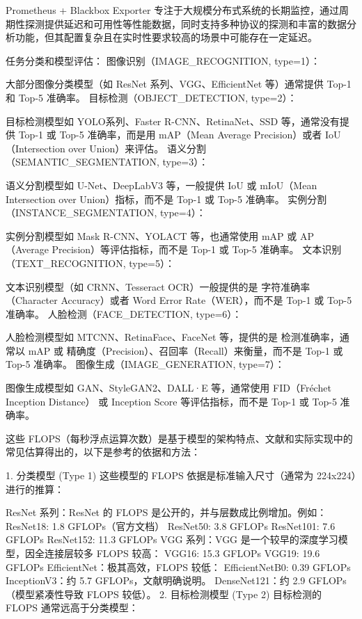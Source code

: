 Prometheus + Blackbox Exporter 专注于大规模分布式系统的长期监控，通过周期性探测提供延迟和可用性等性能数据，同时支持多种协议的探测和丰富的数据分析功能，但其配置复杂且在实时性要求较高的场景中可能存在一定延迟。


任务分类和模型评估：
图像识别（IMAGE_RECOGNITION, type=1）：

大部分图像分类模型（如 ResNet 系列、VGG、EfficientNet 等）通常提供 Top-1 和 Top-5 准确率。
目标检测（OBJECT_DETECTION, type=2）：

目标检测模型如 YOLO系列、Faster R-CNN、RetinaNet、SSD 等，通常没有提供 Top-1 或 Top-5 准确率，而是用 mAP（Mean Average Precision）或者 IoU（Intersection over Union）来评估。
语义分割（SEMANTIC_SEGMENTATION, type=3）：

语义分割模型如 U-Net、DeepLabV3 等，一般提供 IoU 或 mIoU（Mean Intersection over Union）指标，而不是 Top-1 或 Top-5 准确率。
实例分割（INSTANCE_SEGMENTATION, type=4）：

实例分割模型如 Mask R-CNN、YOLACT 等，也通常使用 mAP 或 AP（Average Precision）等评估指标，而不是 Top-1 或 Top-5 准确率。
文本识别（TEXT_RECOGNITION, type=5）：

文本识别模型（如 CRNN、Tesseract OCR）一般提供的是 字符准确率（Character Accuracy）或者 Word Error Rate（WER），而不是 Top-1 或 Top-5 准确率。
人脸检测（FACE_DETECTION, type=6）：

人脸检测模型如 MTCNN、RetinaFace、FaceNet 等，提供的是 检测准确率，通常以 mAP 或 精确度（Precision）、召回率（Recall）来衡量，而不是 Top-1 或 Top-5 准确率。
图像生成（IMAGE_GENERATION, type=7）：

图像生成模型如 GAN、StyleGAN2、DALL·E 等，通常使用 FID（Fréchet Inception Distance） 或 Inception Score 等评估指标，而不是 Top-1 或 Top-5 准确率。



这些 FLOPS（每秒浮点运算次数）是基于模型的架构特点、文献和实际实现中的常见估算得出的，以下是参考的依据和方法：

1. 分类模型 (Type 1)
这些模型的 FLOPS 依据是标准输入尺寸（通常为 224x224）进行的推算：

ResNet 系列：ResNet 的 FLOPS 是公开的，并与层数成比例增加。例如：
ResNet18: 1.8 GFLOPs（官方文档）
ResNet50: 3.8 GFLOPs
ResNet101: 7.6 GFLOPs
ResNet152: 11.3 GFLOPs
VGG 系列：VGG 是一个较早的深度学习模型，因全连接层较多 FLOPS 较高：
VGG16: 15.3 GFLOPs
VGG19: 19.6 GFLOPs
EfficientNet：极其高效，FLOPS 较低：
EfficientNetB0: 0.39 GFLOPs
InceptionV3：约 5.7 GFLOPs，文献明确说明。
DenseNet121：约 2.9 GFLOPs（模型紧凑性导致 FLOPS 较低）。
2. 目标检测模型 (Type 2)
目标检测的 FLOPS 通常远高于分类模型：

